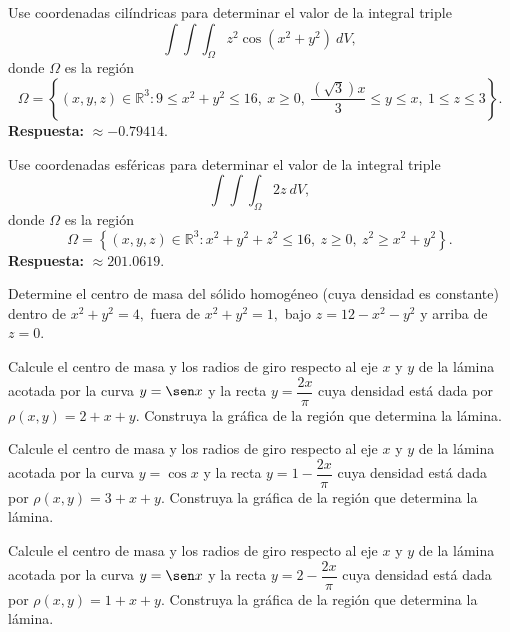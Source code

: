 \begin{prob}
Use coordenadas cilíndricas para determinar el valor de la integral triple $$\displaystyle\int\int\int_{\Omega}z^2\cos\left( x^2+y^2 \right)\ dV,$$ donde $\Omega$ es la región $$\Omega=\left\lbrace (x,y,z)\in \mathbb{R}^3 : 9\leq x^2+y^2 \leq 16,\ x\geq 0,\ \dfrac{(\sqrt{3})x}{3}\leq y \leq x,\ 1\leq z\leq 3 \right\rbrace.$$ \textbf{Respuesta:} $\approx -0.79414$.
\end{prob}

\begin{prob}
Use coordenadas esféricas para determinar el valor de la integral triple $$\displaystyle\int\int\int_{\Omega}2z\ dV,$$ donde $\Omega$ es la región $$\Omega=\left\lbrace (x,y,z)\in \mathbb{R}^3 : x^2+y^2+z^2 \leq 16,\ z\geq 0,\ z^2\geq x^2+y^2 \right\rbrace.$$ \textbf{Respuesta:} $\approx 201.0619$.
\end{prob}

\begin{prob}
Determine el centro de masa del sólido homogéneo (cuya densidad es constante) dentro de $x^2+y^2=4,$ fuera de $x^2+y^2=1,$ bajo $z=12-x^2-y^2$ y arriba de $z=0.$
\end{prob}

\begin{prob}
Calcule el centro de masa y los radios de giro respecto al eje $x$ y $y$ de la lámina acotada por la curva $y=\sen x$ y la recta $y=\dfrac{2x}{\pi}$ cuya densidad está dada por $\rho(x,y)=2+x+y.$ Construya la gráfica de la región que determina la lámina.
\end{prob}


\begin{prob}
Calcule el centro de masa y los radios de giro respecto al eje $x$ y $y$ de la lámina acotada por la curva $y=\cos x$ y la recta $y=1-\dfrac{2x}{\pi}$ cuya densidad está dada por $\rho(x,y)=3+x+y.$ Construya la gráfica de la región que determina la lámina.
\end{prob}

\begin{prob}
Calcule el centro de masa y los radios de giro respecto al eje $x$ y $y$ de la lámina acotada por la curva $y=\sen x$ y la recta $y=2-\dfrac{2x}{\pi}$ cuya densidad está dada por $\rho(x,y)=1+x+y.$ Construya la gráfica de la región que determina la lámina.
\end{prob}

